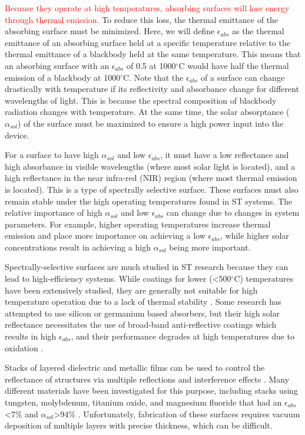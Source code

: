 \documentclass[review]{elsarticle}
\begin{document}
\textcolor{red}{Because they operate at high temperatures, absorbing surfaces will lose energy through thermal emission.}  To reduce this loss, the thermal emittance of the absorbing surface must be minimized.  Here, we will define $\epsilon_{abs}$ as the thermal emittance of an absorbing surface held at a specific temperature relative to the thermal emittance of a blackbody held at the same temperature.  This means that an absorbing surface with an $\epsilon_{abs}$ of 0.5 at 1000$^\circ$C would have half the thermal emission of a blackbody at 1000$^\circ$C.  Note that the $\epsilon_{abs}$ of a surface can change drastically with temperature if its reflectivity and absorbance change for different wavelengths of light.  This is because the spectral composition of blackbody radiation changes with temperature.  At the same time, the solar absorptance ($\alpha_{sol}$) of the surface must be maximized to ensure a high power input into the device.

For a surface to have high $\alpha_{sol}$ and low $\epsilon_{abs}$, it must have a low reflectance and high absorbance in visible wavelengths (where most solar light is located), and a high reflectance in the near infra-red (NIR) region (where most thermal emission is located).  This is a type of spectrally selective surface.  These surfaces must also remain stable under the high operating temperatures found in ST systems.  The relative importance of high $\alpha_{sol}$ and low $\epsilon_{abs}$ can change due to changes in system parameters.  For example, higher operating temperatures increase thermal emission and place more importance on achieving a low $\epsilon_{abs}$, while higher solar concentrations result in achieving a high $\alpha_{sol}$ being more important.

Spectrally-selective surfaces are much studied in ST research 
because they can lead to high-efficiency systems.  While coatings for lower (\textless500$^\circ$C) temperatures have been extensively studied, they are generally not suitable for high temperature operation due to a lack of thermal stability \cite{A1}.  Some research has attempted to use silicon or germanium based absorbers, but their high solar reflectance necessitates the use of broad-band anti-reflective coatings which results in high $\epsilon_{abs}$, and their performance degrades at high temperatures due to oxidation \cite{A2}. 

Stacks of layered dielectric and metallic films can be used to control the reflectance of structures via multiple reflections and interference effects \cite{A3}.  Many different materials have been investigated for this purpose, including stacks using tungsten, molybdenum, titanium oxide, and magnesium fluoride that had an $\epsilon_{abs}$\textless7\% and $\alpha_{sol}$\textgreater94\% \cite{paper1_ref7,stacks2, A2}.  Unfortunately, fabrication of these surfaces requires vacuum deposition of multiple layers with precise thickness, which can be difficult.
\end{document}
